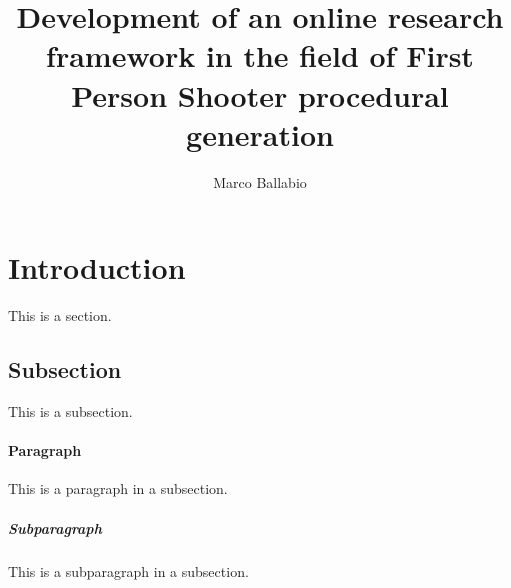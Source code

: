 \documentclass{book}
\title{Development of an online research framework in the field of First Person Shooter procedural generation}
\author{Marco Ballabio}
\date{\vspace{-5ex}}
\begin{document}
\maketitle
{}
\newpage
{}

\section{Introduction}

This is a section.

\subsection{Subsection}

This is a subsection.

\paragraph{Paragraph} 

This is a paragraph in a subsection.

 \subparagraph{Subparagraph} 
 
 This is a subparagraph in a subsection.
\end{document}
